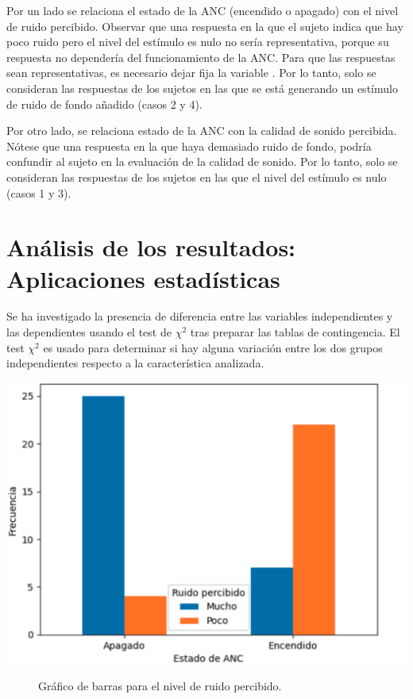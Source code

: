 \documentclass[a4paper,12pt]{article}
\begin{document}
Por un lado se relaciona el estado de la ANC (encendido o apagado) con el nivel de ruido percibido.
Observar que una respuesta en la que el sujeto indica que hay poco ruido pero el nivel del estímulo es nulo no sería representativa, porque su respuesta no dependería del funcionamiento de la ANC.
Para que las respuestas sean representativas, es necesario dejar fija la variable .
Por lo tanto, solo se consideran las respuestas de los sujetos en las que se está generando un estímulo de ruido de fondo añadido (casos 2 y 4).

Por otro lado, se relaciona estado de la ANC con la calidad de sonido percibida.
Nótese que una respuesta en la que haya demasiado ruido de fondo, podría confundir al sujeto en la evaluación de la calidad de sonido.
Por lo tanto, solo se consideran las respuestas de los sujetos en las que el nivel del estímulo es nulo (casos 1 y 3).

\section{Análisis de los resultados: Aplicaciones estadísticas}
\label{sec:results}

Se ha investigado la presencia de diferencia entre las variables independientes y las dependientes usando el test de $\chi^2$ tras preparar las tablas de contingencia.
El test $\chi^2$ es usado para determinar si hay alguna variación entre los dos grupos independientes respecto a la característica analizada.

\begin{center}
    \includegraphics[width=0.7\linewidth]{images/cross_Y1.png}
\end{center}
\vspace{\captionSpace}
\begin{figure}[H]
    \caption{Gráfico de barras para el nivel de ruido percibido.}
    \label{fig:cross_Y1}
\end{figure}
\end{document}
